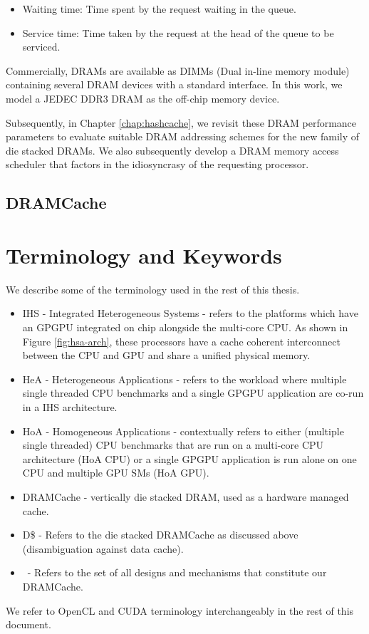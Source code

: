 \begin{itemize}
	\item Waiting time: Time spent by the request waiting in the queue.
	\item Service time: Time taken by the request at the head of the queue to be serviced.
\end{itemize}
\par Commercially, DRAMs are available as DIMMs (Dual in-line memory module) containing several DRAM devices with a standard interface. In this work, we model a JEDEC DDR3 DRAM \cite{jedec-ddr3} as the off-chip memory device.
\par Subsequently, in Chapter \ref{chap:hashcache}, we revisit these DRAM performance parameters to evaluate suitable DRAM addressing schemes for the new family of die stacked DRAMs. We also subsequently develop a DRAM memory access scheduler that factors in the idiosyncrasy of the requesting processor.

\subsection{DRAMCache}

\section{Terminology and Keywords}
We describe some of the terminology used in the rest of this thesis.
\begin{itemize}
	\item IHS - Integrated Heterogeneous Systems - refers to the platforms which have an GPGPU integrated on chip alongside the multi-core CPU. As shown in Figure \ref{fig:hsa-arch}, these processors have a cache coherent interconnect between the CPU and GPU and share a unified physical memory.
	\item HeA - Heterogeneous Applications - refers to the workload where multiple single threaded CPU benchmarks and a single GPGPU application are co-run in a IHS architecture.
	\item HoA - Homogeneous Applications - contextually refers to either (multiple single threaded) CPU benchmarks that are run on a multi-core CPU architecture (HoA CPU) or a single GPGPU application is run alone on one CPU and multiple GPU SMs (HoA GPU).
	\item DRAMCache - vertically die stacked DRAM, used as a hardware managed cache.
	\item D\$ - Refers to the die stacked DRAMCache as discussed above (disambiguation against data cache).
	\item \cachename\ - Refers to the set of all designs and mechanisms that constitute our DRAMCache.
\end{itemize}
We refer to OpenCL \cite{opencl} and CUDA \cite{cuda} terminology interchangeably in the rest of this document.



